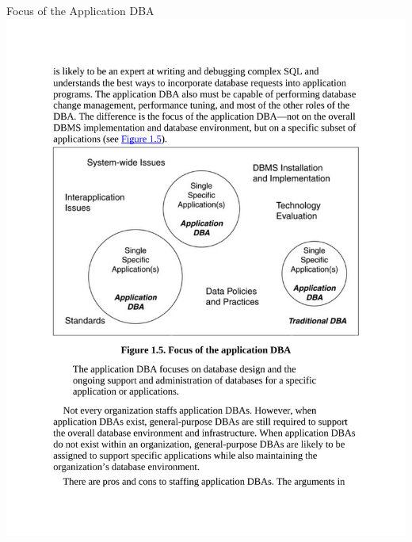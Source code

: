 \documentclass{beamer}
\begin{document}
\begin{frame}{Focus of the Application DBA}
    \centering
    \includegraphics[width=\textwidth, trim={2.55cm 10.60cm 2.55cm 6.80cm}, clip]{figures/app_dba}
\end{frame}
\end{document}
